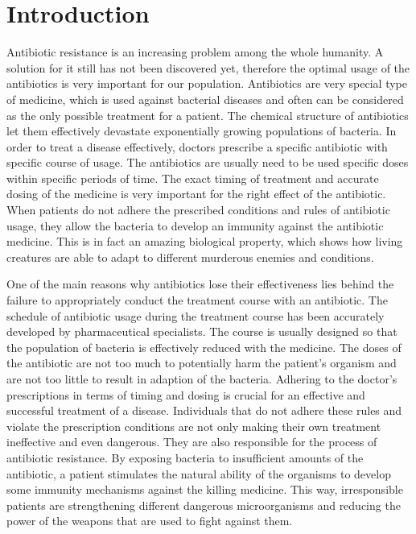 \chapter*{Introduction}


Antibiotic resistance is an increasing problem among the whole humanity. A solution for it still has not been discovered yet, therefore the optimal usage of the antibiotics is very important for our population. Antibiotics are very special type of medicine, which is used against bacterial diseases and often can be considered as the only possible treatment for a patient. The chemical structure of antibiotics let them effectively devastate exponentially growing populations of bacteria. In order to treat a disease effectively, doctors prescribe a specific antibiotic with specific course of usage. The antibiotics are usually need to be used specific doses within specific periods of time. The exact timing of treatment and accurate dosing of the medicine is very important for the right effect of the antibiotic. When patients do not adhere the prescribed conditions and rules of antibiotic usage, they allow the bacteria to develop an immunity against the antibiotic medicine. This is in fact an amazing biological property, which shows how living creatures are able to adapt to different murderous enemies and conditions.

One of the main reasons why antibiotics lose their effectiveness lies behind the failure to appropriately conduct the treatment course with an antibiotic. The schedule of antibiotic usage during the treatment course has been accurately developed by pharmaceutical specialists. The course is usually designed so that the population of bacteria is effectively reduced with the medicine. The doses of the antibiotic are not too much to potentially harm the patient's organism and are not too little to result in adaption of the bacteria. Adhering to the doctor's prescriptions in terms of timing and dosing is crucial for an effective and successful treatment of a disease. Individuals that do not adhere these rules and violate the prescription conditions are not only making their own treatment ineffective and even dangerous. They are also responsible for the process of antibiotic resistance. By exposing bacteria to insufficient amounts of the antibiotic, a patient stimulates the natural ability of the organisms to develop some immunity mechanisms against the killing medicine. This way, irresponsible patients are strengthening different dangerous microorganisms and reducing the power of the weapons that are used to fight against them.


